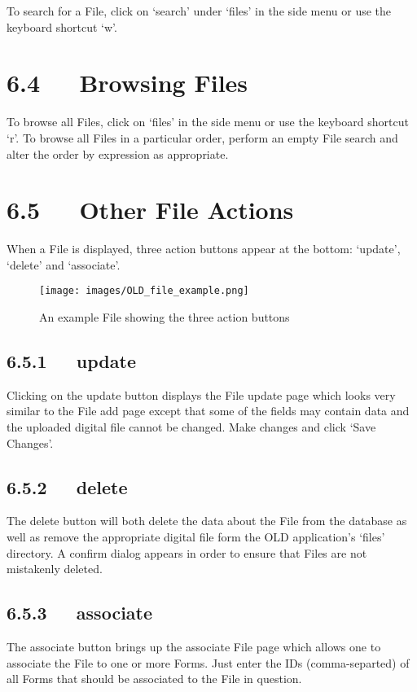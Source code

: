 \documentclass[letterpaper,10pt,english]{sphinxmanual}
\begin{document}
To search for a File, click on `search' under `files' in the side menu or use
the keyboard shortcut `w'.


\section{6.4   Browsing Files}
\label{documentation:browsing-files}
To browse all Files, click on `files' in the side menu or use the keyboard
shortcut `r'.  To browse all Files in a particular order, perform an empty File
search and alter the order by expression as appropriate.


\section{6.5   Other File Actions}
\label{documentation:other-file-actions}
When a File is displayed, three action buttons appear at the bottom: `update',
`delete' and `associate'.
\begin{figure}[htbp]
\centering
\capstart

\texttt{[image: images/OLD\_file\_example.png]}
\caption{An example File showing the three action buttons}\end{figure}


\subsection{6.5.1   update}
\label{documentation:id7}
Clicking on the update button displays the File update page which looks very
similar to the File add page except that some of the fields may contain data and
the uploaded digital file cannot be changed.  Make changes and click `Save
Changes'.


\subsection{6.5.2   delete}
\label{documentation:id8}
The delete button will both delete the data about the File from the database as
well as remove the appropriate digital file form the OLD application's `files'
directory.  A confirm dialog appears in order to ensure that Files are not
mistakenly deleted.


\subsection{6.5.3   associate}
\label{documentation:id9}
The associate button brings up the associate File page which allows one to
associate the File to one or more Forms.  Just enter the IDs (comma-separted) of
all Forms that should be associated to the File in question.
\end{document}
